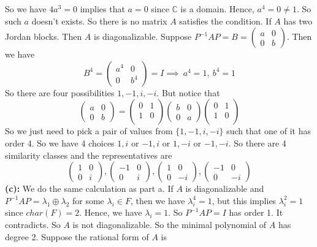 \documentclass[12pt]{amsart}
\newcommand{\C}{\mathbb{C}}
\begin{document}
So we have $4a^3=0$ implies that $a=0$ since $\C$ is a domain. Hence, $a^4=0\neq 1$. So such $a$ doesn't exists. So there is no matrix $A$ satisfies the condition. If $A$ has two Jordan blocks. Then $A$ is diagonalizable. Suppose $P^{-1}AP=B=\begin{pmatrix}
    a&0\\
    0&b
\end{pmatrix}$. Then we have 
\[B^4=\begin{pmatrix}
    a^4&0\\
    0&b^4
\end{pmatrix}=I\implies \ a^4=1,\   b^4=1\]
So there are four possibilities $1,-1,i,-i$. But notice that 
\[\begin{pmatrix}
    a&0\\
    0&b
\end{pmatrix}=\begin{pmatrix}
    0&1\\
    1&0\\
\end{pmatrix}\begin{pmatrix}
    b&0\\
    0&a
\end{pmatrix}\begin{pmatrix}
    0&1\\
    1&0\\
\end{pmatrix}\]
So we just need to pick a pair of values from $\{1,-1,i,-i\}$ such that one of it has order 4. So we have 4 choices $1,i$ or $-1,i$ or $1,-i$ or $-1,-i$. 
So there are 4 similarity classes and the representatives are 
\[\begin{pmatrix}
    1&0\\
    0&i
\end{pmatrix},\begin{pmatrix}
    -1&0\\
    0&i
\end{pmatrix},\begin{pmatrix}
    1&0\\
    0&-i
\end{pmatrix},\begin{pmatrix}
    -1&0\\
    0&-i
\end{pmatrix}\]
\textbf{(c): } We do the same calculation as part a. If $A$ is diagonalizable and $P^{-1}AP=\lambda_1\oplus \lambda_2$ for some $\lambda_i\in F$, then we have $\lambda_i^4=1$, but this implies $\lambda_i^2=1$ since $char(F)=2$. Hence, we have $\lambda_i=1$. So $P^{-1}AP=I$ has order 1. It contradicts. So $A$ is not diagonalizable. So the minimal polynomial of $A$ has degree 2. Suppose the rational form of $A$ is 
\end{document}
